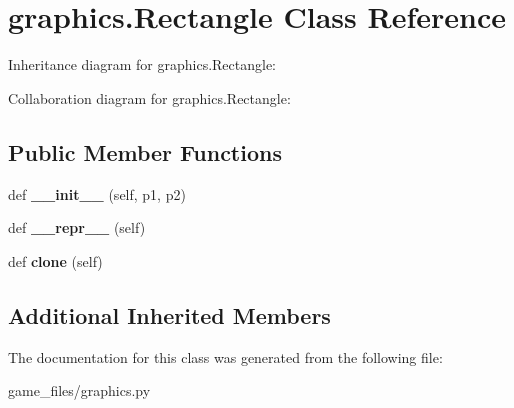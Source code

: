 \hypertarget{classgraphics_1_1Rectangle}{}\section{graphics.\+Rectangle Class Reference}
\label{classgraphics_1_1Rectangle}


Inheritance diagram for graphics.\+Rectangle\+:


Collaboration diagram for graphics.\+Rectangle\+:
\subsection*{Public Member Functions}
\begin{DoxyCompactItemize}
\item 
def {\bfseries \+\_\+\+\_\+init\+\_\+\+\_\+} (self, p1, p2)\hypertarget{classgraphics_1_1Rectangle_a691f947134b1fc54443c55aa9d6214c5}{}\label{classgraphics_1_1Rectangle_a691f947134b1fc54443c55aa9d6214c5}

\item 
def {\bfseries \+\_\+\+\_\+repr\+\_\+\+\_\+} (self)\hypertarget{classgraphics_1_1Rectangle_af16c7826cc639912ec3ef819f6ac467e}{}\label{classgraphics_1_1Rectangle_af16c7826cc639912ec3ef819f6ac467e}

\item 
def {\bfseries clone} (self)\hypertarget{classgraphics_1_1Rectangle_aaffe12a1bc2f5fc5ff221c909d2fb583}{}\label{classgraphics_1_1Rectangle_aaffe12a1bc2f5fc5ff221c909d2fb583}

\end{DoxyCompactItemize}
\subsection*{Additional Inherited Members}


The documentation for this class was generated from the following file\+:\begin{DoxyCompactItemize}
\item 
game\+\_\+files/graphics.\+py\end{DoxyCompactItemize}

